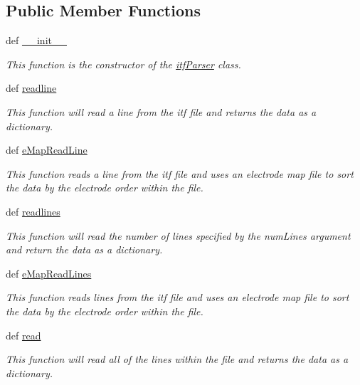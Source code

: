 \subsection*{Public Member Functions}
\begin{DoxyCompactItemize}
\item 
def \hyperlink{classitf_parser_1_1itf_parser_a602ae721f43a6ab6e266adbd5832f7d2}{\-\_\-\-\_\-init\-\_\-\-\_\-}
\begin{DoxyCompactList}\small\item\em This function is the constructor of the \hyperlink{classitf_parser_1_1itf_parser}{itf\-Parser} class. \end{DoxyCompactList}\item 
def \hyperlink{classitf_parser_1_1itf_parser_a3465ff6efcfb3fa67661b64f57460ab3}{readline}
\begin{DoxyCompactList}\small\item\em This function will read a line from the itf file and returns the data as a dictionary. \end{DoxyCompactList}\item 
def \hyperlink{classitf_parser_1_1itf_parser_a88b52051bda28ba4aa6d01e67df4eff8}{e\-Map\-Read\-Line}
\begin{DoxyCompactList}\small\item\em This function reads a line from the itf file and uses an electrode map file to sort the data by the electrode order within the file. \end{DoxyCompactList}\item 
def \hyperlink{classitf_parser_1_1itf_parser_a96e49b5e71fc80b9f11b69df0991098e}{readlines}
\begin{DoxyCompactList}\small\item\em This function will read the number of lines specified by the num\-Lines argument and return the data as a dictionary. \end{DoxyCompactList}\item 
def \hyperlink{classitf_parser_1_1itf_parser_aea4cee95e30363dbe991d1a66a528675}{e\-Map\-Read\-Lines}
\begin{DoxyCompactList}\small\item\em This function reads lines from the itf file and uses an electrode map file to sort the data by the electrode order within the file. \end{DoxyCompactList}\item 
def \hyperlink{classitf_parser_1_1itf_parser_a70cd8c41822cacc0dfb3f9465849e981}{read}
\begin{DoxyCompactList}\small\item\em This function will read all of the lines within the file and returns the data as a dictionary. \end{DoxyCompactList}\item 

\end{DoxyCompactItemize}
